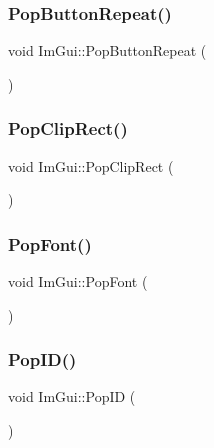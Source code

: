 \subsubsection{\texorpdfstring{Pop\+Button\+Repeat()}{PopButtonRepeat()}}
{\footnotesize\ttfamily void Im\+Gui\+::\+Pop\+Button\+Repeat (\begin{DoxyParamCaption}{ }\end{DoxyParamCaption})}

\hypertarget{namespace_im_gui_aef1c8a6e5a3c70cb10d03d2a2a66dfd8}{}\label{namespace_im_gui_aef1c8a6e5a3c70cb10d03d2a2a66dfd8} 
\subsubsection{\texorpdfstring{Pop\+Clip\+Rect()}{PopClipRect()}}
{\footnotesize\ttfamily void Im\+Gui\+::\+Pop\+Clip\+Rect (\begin{DoxyParamCaption}{ }\end{DoxyParamCaption})}

\hypertarget{namespace_im_gui_af66649bc37022bf3cf2496c73af9a499}{}\label{namespace_im_gui_af66649bc37022bf3cf2496c73af9a499} 
\subsubsection{\texorpdfstring{Pop\+Font()}{PopFont()}}
{\footnotesize\ttfamily void Im\+Gui\+::\+Pop\+Font (\begin{DoxyParamCaption}{ }\end{DoxyParamCaption})}

\hypertarget{namespace_im_gui_aba0b2d8f890a5d435ae43d0c4a2d4dd1}{}\label{namespace_im_gui_aba0b2d8f890a5d435ae43d0c4a2d4dd1} 
\subsubsection{\texorpdfstring{Pop\+I\+D()}{PopID()}}
{\footnotesize\ttfamily void Im\+Gui\+::\+Pop\+ID (\begin{DoxyParamCaption}{ }\end{DoxyParamCaption})}

\hypertarget{namespace_im_gui_aa93281155e1dd23715dbd384e91edc6b}{}\label{namespace_im_gui_aa93281155e1dd23715dbd384e91edc6b} 
